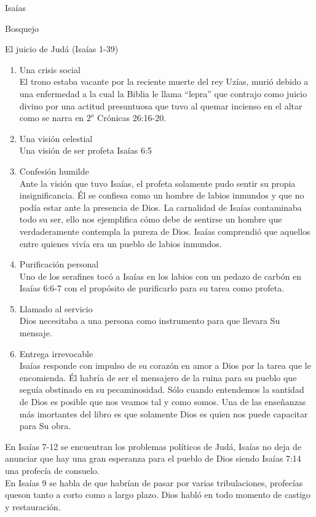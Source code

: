 \begin{section}{Isaías}
\begin{subsection}{Bosquejo}
\begin{subsubsection}{El juicio de Judá (Isaías 1-39)}
\begin{itemize}
\begin{enumerate}
	\item Una crisis social\\
		El trono estaba vacante por la reciente muerte del rey Uzías, murió debido a una enfermedad a la cual la Biblia le llama ``lepra'' que contrajo como juicio divino por una actitud presuntuosa que tuvo al quemar incienso en el altar como se narra en $2^{o}$ Crónicas 26:16-20.
	\item Una visión celestial\\
		Una visión de ser profeta Isaías 6:5
	\item Confesión humilde\\
Ante la visión que tuvo Isaías, el profeta solamente pudo sentir su propia insignificancia. Él se confiesa como un hombre de labios inmundos y que no podía estar ante la presencia de Dios. La carnalidad de Isaías contaminaba todo su ser, ello nos ejemplifica cómo debe de sentirse un hombre que verdaderamente contempla la pureza de Dios. Isaías comprendió que aquellos entre quienes vivía era un pueblo de labios inmundos.\\
\item Purificación personal\\
	Uno de los serafines tocó a Isaías en los labios con un pedazo de carbón en Isaías 6:6-7 con el propósito de purificarlo para su tarea como profeta.
\item Llamado al servicio\\
	Dios necesitaba a una persona como instrumento para que llevara Su mensaje.
\item Entrega irrevocable\\
	Isaías responde con impulso de su corazón en amor a Dios por la tarea que le encomienda. Él habría de ser el mensajero de la ruina para su pueblo que seguía obstinado en su pecaminosidad. Sólo cuando entendemos la santidad de Dios es posible que nos veamos tal y como somos. Una de las enseñanzas más imortantes del libro es que solamente Dios es quien nos puede capacitar para Su obra.
\end{enumerate}
En Isaías 7-12 se encuentran los problemas políticos de Judá, Isaías no deja de anunciar que hay una gran esperanza para el pueblo de Dios siendo Isaías 7:14 una profecía de consuelo.\\
En Isaías 9 se habla de que habrían de pasar por varias tribulaciones, profecías queson tanto a corto como a largo plazo. Dios habló en todo momento de castigo y restauración.\\

\end{itemize}
\end{subsubsection}
\end{subsection}
\end{section}
